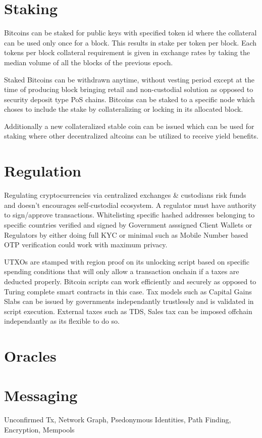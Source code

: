 \documentclass[a4paper,10pt]{article}
\begin{document}
\section{Staking}

Bitcoins can be staked for public keys with specified token id where the collateral can be used only once for a block. This results in stake per token per block. Each tokens per block collateral requirement is given in exchange rates by taking the median volume of all the blocks of the previous epoch.

Staked Bitcoins can be withdrawn anytime, without vesting period except at the time of producing block bringing retail and non-custodial solution as opposed to security deposit type PoS chains. Bitcoins can be staked to a specific node which choses to include the stake by collateralizing or locking in its allocated block.

 Additionally a new collateralized stable coin can be issued which can be used for staking where other decentralized altcoins can be utilized to receive yield benefits. 

\section{Regulation}
Regulating cryptocurrencies via centralized exchanges \& custodians risk funds and doesn't encourages self-custodial ecosystem. A regulator must have authority to sign/approve transactions. Whitelisting specific hashed addresses belonging to specific countries verified and signed by Government asssigned Client Wallets or Regulators by either doing full KYC or minimal such as Mobile Number based OTP verification could work with maximum privacy. 

UTXOs are stamped with region proof on its unlocking script based on specific spending conditions that will only allow a transaction onchain if a taxes are deducted properly. Bitcoin scripts can work efficiently and securely as opposed to Turing complete smart contracts in this case. Tax models such as Capital Gains Slabs can be issued by governments independantly trustlessly and is validated in script execution. External taxes such as TDS, Sales tax can be imposed offchain independantly as its flexible to do so.

\section{Oracles}

\section{Messaging}
Unconfirmed Tx, Network Graph, Psedonymous Identities, Path Finding, Encryption, Mempools
\end{document}

